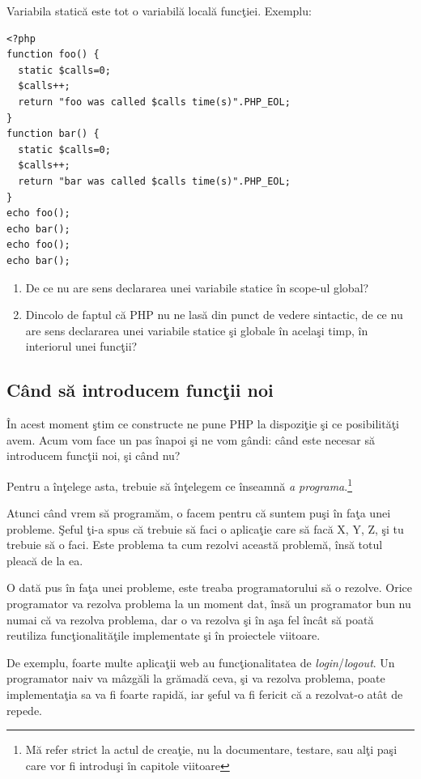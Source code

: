 Variabila statică este tot o variabilă locală funcţiei. Exemplu:
\begin{lstlisting}
<?php
function foo() {
  static $calls=0;
  $calls++;
  return "foo was called $calls time(s)".PHP_EOL;
}
function bar() {
  static $calls=0;
  $calls++;
  return "bar was called $calls time(s)".PHP_EOL;
}
echo foo();
echo bar();
echo foo();
echo bar();
\end{lstlisting}

\begin{Exercise}[title={static vs. global}]
\begin{enumerate}
	\item De ce nu are sens declararea unei variabile statice în scope-ul global?
	\item Dincolo de faptul că PHP nu ne lasă din punct de vedere sintactic, de ce nu are sens
declararea unei variabile statice şi globale în acelaşi timp, în interiorul unei
funcţii?
\end{enumerate}
\end{Exercise}

\subsection{Când să introducem funcţii noi}
În acest moment ştim ce constructe ne pune PHP la dispoziţie şi ce
posibilităţi avem. Acum vom face un pas înapoi şi ne vom gândi:
când este necesar să introducem funcţii noi, şi când nu?

Pentru a înţelege asta, trebuie să înţelegem ce înseamnă
\textit{a programa}.\footnote{Mă refer strict la actul de creaţie,
nu la documentare, testare, sau alţi paşi care vor fi introduşi
în capitole viitoare}

Atunci când vrem să programăm, o facem pentru că suntem puşi în
faţa unei probleme. Şeful ţi-a spus că trebuie să faci o aplicaţie
care să facă X, Y, Z, şi tu trebuie să o faci. Este problema ta
cum rezolvi această problemă, însă totul pleacă de la ea.

O dată pus în faţa unei probleme, este treaba programatorului
să o rezolve. Orice programator va rezolva problema la un
moment dat, însă un programator bun nu numai că va rezolva
problema, dar o va rezolva şi în aşa fel încât să poată
reutiliza funcţionalităţile implementate şi în proiectele
viitoare.

De exemplu, foarte multe aplicaţii web au funcţionalitatea
de \textit{login}/\textit{logout}. Un programator naiv
va mâzgăli la grămadă ceva, şi va rezolva problema, poate
implementaţia sa va fi foarte rapidă, iar şeful va fi
fericit că a rezolvat-o atât de repede.

